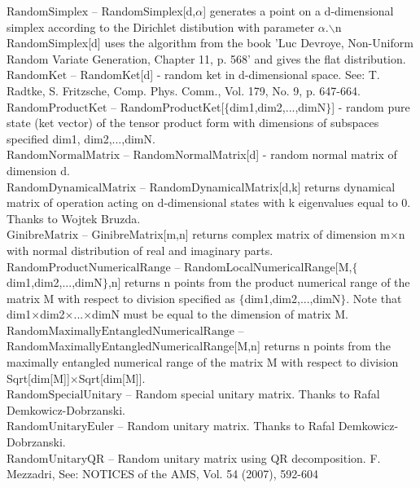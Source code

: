 \documentclass[a4paper,10pt]{scrartcl}
\begin{document}
\noindent\textbf{$ \text{RandomSimplex} $ }-- RandomSimplex[d,$\alpha $] generates a point on a d-dimensional simplex according to the Dirichlet distibution with parameter $\alpha $.$\backslash $n RandomSimplex[d] uses the algorithm from the book 'Luc Devroye, Non-Uniform Random Variate Generation, Chapter 11, p. 568' and gives the flat distribution.$  $\\[8pt]
\noindent\textbf{$ \text{RandomKet} $ }-- RandomKet[d] - random ket in d-dimensional space. See: T. Radtke, S. Fritzsche, Comp. Phys. Comm., Vol. 179, No. 9, p. 647-664.$  $\\[8pt]
\noindent\textbf{$ \text{RandomProductKet} $ }-- RandomProductKet[$\{$dim1,dim2,...,dimN$\}$] - random pure state (ket vector) of the tensor product form with dimensions of subspaces specified dim1, dim2,...,dimN.$  $\\[8pt]
\noindent\textbf{$ \text{RandomNormalMatrix} $ }-- RandomNormalMatrix[d] - random normal matrix of dimension d.$  $\\[8pt]
\noindent\textbf{$ \text{RandomDynamicalMatrix} $ }-- RandomDynamicalMatrix[d,k] returns dynamical matrix of operation acting on d-dimensional states with k eigenvalues equal to 0. Thanks to Wojtek Bruzda.$  $\\[8pt]
\noindent\textbf{$ \text{GinibreMatrix} $ }-- GinibreMatrix[m,n] returns complex matrix of dimension m$\times $n with normal distribution of real and imaginary parts.$  $\\[8pt]
\noindent\textbf{$ \text{RandomProductNumericalRange} $ }-- RandomLocalNumericalRange[M,$\{$dim1,dim2,...,dimN$\}$,n] returns n points from the product numerical range of the matrix M with respect to division specified as $\{$dim1,dim2,...,dimN$\}$. Note that dim1$\times $dim2$\times $...$\times $dimN must be equal to the dimension of matrix M.$  $\\[8pt]
\noindent\textbf{$ \text{RandomMaximallyEntangledNumericalRange} $ }-- RandomMaximallyEntangledNumericalRange[M,n] returns n points from the maximally entangled numerical range of the matrix M with respect to division Sqrt[dim[M]]$\times $Sqrt[dim[M]].$  $\\[8pt]
\noindent\textbf{$ \text{RandomSpecialUnitary} $ }-- Random special unitary matrix. Thanks to Rafal Demkowicz-Dobrzanski.$  $\\[8pt]
\noindent\textbf{$ \text{RandomUnitaryEuler} $ }-- Random unitary matrix. Thanks to Rafal Demkowicz-Dobrzanski.$  $\\[8pt]
\noindent\textbf{$ \text{RandomUnitaryQR} $ }-- Random unitary matrix using QR decomposition. F. Mezzadri, See: NOTICES of the AMS, Vol. 54 (2007), 592-604$  $\\[8pt]
\end{document}
